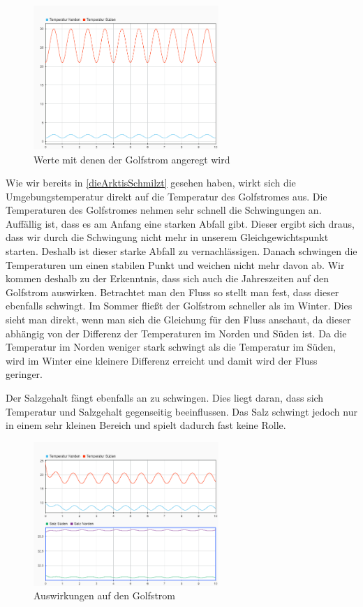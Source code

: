 \documentclass[a4paper,twoside]{article}
\begin{document}
	\begin{figure}[!h]
  		\centering
 		\includegraphics[width=7cm]{../Diagramme/Jahreszeiten_init.png}
  		\caption{Werte mit denen der Golfstrom angeregt wird}
  		\label{fig:jahreszeitenUmgebung}
	\end{figure}
	
	Wie wir bereits in \ref{dieArktisSchmilzt} gesehen haben, wirkt sich die Umgebungstemperatur direkt auf die Temperatur des Golfstromes aus. Die Temperaturen des Golfstromes nehmen sehr schnell die Schwingungen an. Auffällig ist, dass es am Anfang eine starken Abfall gibt. Dieser ergibt sich draus, dass wir durch die Schwingung nicht mehr in unserem Gleichgewichtspunkt starten. Deshalb ist dieser starke Abfall zu vernachlässigen. Danach schwingen die Temperaturen um einen stabilen Punkt und weichen nicht mehr davon ab. Wir kommen deshalb zu der Erkenntnis, dass sich auch die Jahreszeiten auf den Golfstrom auswirken. Betrachtet man den Fluss so stellt man fest, dass dieser ebenfalls schwingt. Im Sommer fließt der Golfstrom schneller als im Winter. Dies sieht man direkt, wenn man sich die Gleichung für den Fluss anschaut, da dieser abhängig von der Differenz der Temperaturen im Norden und Süden ist. Da die Temperatur im Norden weniger stark schwingt als die Temperatur im Süden, wird im Winter eine kleinere Differenz erreicht und damit wird der Fluss geringer.
	
	Der Salzgehalt fängt ebenfalls an zu schwingen. Dies liegt daran, dass sich Temperatur und Salzgehalt gegenseitig beeinflussen. Das Salz schwingt jedoch nur in einem sehr kleinen Bereich und spielt dadurch fast keine Rolle.

	\begin{figure}[!h]
  		\centering
 		\includegraphics[width=7cm]{../Diagramme/Jahreszeiten_werte.png}
  		\caption{Auswirkungen auf den Golfstrom}
  		\label{fig:jahreszeitenGolf}
	\end{figure}
\end{document}
